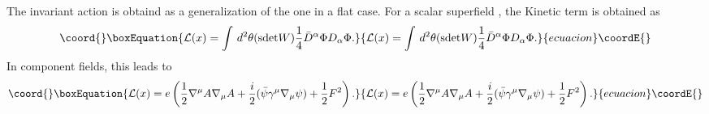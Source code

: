 \documentclass[a4paper,12pt]{article}
\def\bpsi{\bar{\psi}}
\begin{document}
The invariant action is obtaind as a
generalization of the one in a flat case. For a scalar superfield \myHighlight{$\Phi$}\coordHE{},
the Kinetic term is obtained as
\begin{equation}\coord{}\boxEquation{
 \mathcal{L}(x)
  = \int\,d^{2}\theta (\mathrm{sdet}W)
  \frac{1}{4}{\bar D^{\alpha}\Phi} D_{\alpha}\Phi. 
}{
 \mathcal{L}(x)
  = \int\,d^{2}\theta (\mathrm{sdet}W)
  \frac{1}{4}{\bar D^{\alpha}\Phi} D_{\alpha}\Phi. 
}{ecuacion}\coordE{}\end{equation}
In component fields, this leads to
\begin{equation}\coord{}\boxEquation{
 \mathcal{L}(x)
  = e\left(\frac{1}{2}\nabla^{\mu}A\nabla_{\mu}A
  + \frac{i}{2}(\bpsi\gamma^{\mu}\nabla_{\mu}\psi)
  + \frac{1}{2}F^{2}\right).
   \label{ospkinelag}
}{
 \mathcal{L}(x)
  = e\left(\frac{1}{2}\nabla^{\mu}A\nabla_{\mu}A
  + \frac{i}{2}(\bpsi\gamma^{\mu}\nabla_{\mu}\psi)
  + \frac{1}{2}F^{2}\right).
   }{ecuacion}\coordE{}\end{equation}

\vspace{0.3cm}
\vspace{0.3cm}
\end{document}
